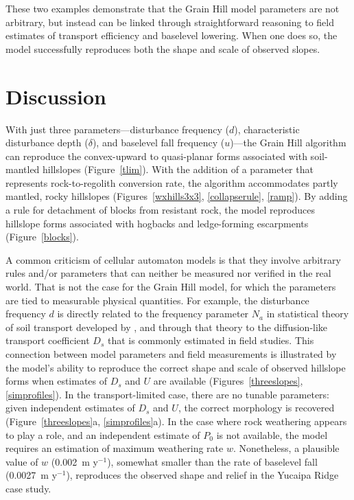 \documentclass[esurf, manuscript]{copernicus}
\begin{document}
These two examples demonstrate that the Grain Hill model parameters are not arbitrary, but instead can be linked through straightforward reasoning to field estimates of transport efficiency and baselevel lowering. When one does so, the model successfully reproduces both the shape and scale of observed slopes.


\section{Discussion}

With just three parameters---disturbance frequency ($d$), characteristic disturbance depth ($\delta$), and baselevel fall frequency ($u$)---the Grain Hill algorithm can reproduce the convex-upward to quasi-planar forms associated with soil-mantled hillslopes (Figure~\ref{tlim}). With the addition of a parameter that represents rock-to-regolith conversion rate, the algorithm accommodates partly mantled, rocky hillslopes (Figures~\ref{wxhills3x3}, \ref{collapserule}, \ref{ramp}). By adding a rule for detachment of blocks from resistant rock, the model reproduces hillslope forms associated with hogbacks and ledge-forming escarpments (Figure~\ref{blocks}).

A common criticism of cellular automaton models is that they involve arbitrary rules and/or parameters that can neither be measured nor verified in the real world. That is not the case for the Grain Hill model, for which the parameters are tied to measurable physical quantities. For example, the disturbance frequency $d$ is directly related to the frequency parameter $N_a$ in statistical theory of soil transport developed by \citet{furbish2009statistical}, and through that theory to the diffusion-like transport coefficient $D_s$ that is commonly estimated in field studies. This connection between model parameters and field measurements is illustrated by the model's ability to reproduce the correct shape and scale of observed hillslope forms when estimates of $D_s$ and $U$ are available (Figures~\ref{threeslopes}, \ref{simprofiles}). In the transport-limited case, there are no tunable parameters: given independent estimates of $D_s$ and $U$, the correct morphology is recovered (Figure~\ref{threeslopes}a, \ref{simprofiles}a). In the case where rock weathering appears to play a role, and an independent estimate of $P_0$ is not available, the model requires an estimation of maximum weathering rate $w$. Nonetheless, a plausible value of $w$ (0.002~m y$^{-1}$), somewhat smaller than the rate of baselevel fall (0.0027~m y$^{-1}$), reproduces the observed shape and relief in the Yucaipa Ridge case study. 
\end{document}
